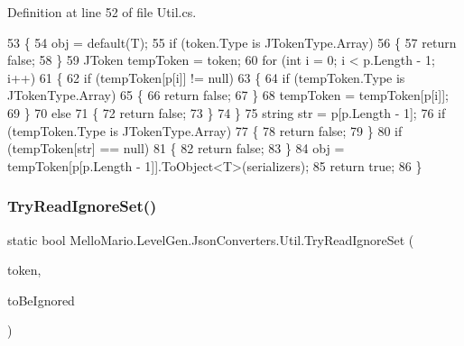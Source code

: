 Definition at line 52 of file Util.\+cs.


\begin{DoxyCode}
53         \{
54             obj = \textcolor{keywordflow}{default}(T);
55             \textcolor{keywordflow}{if} (token.Type is JTokenType.Array)
56             \{
57                 \textcolor{keywordflow}{return} \textcolor{keyword}{false};
58             \}
59             JToken tempToken = token;
60             \textcolor{keywordflow}{for} (\textcolor{keywordtype}{int} i = 0; i < p.Length - 1; i++)
61             \{
62                 \textcolor{keywordflow}{if} (tempToken[p[i]] != null)
63                 \{
64                     \textcolor{keywordflow}{if} (tempToken.Type is JTokenType.Array)
65                     \{
66                         \textcolor{keywordflow}{return} \textcolor{keyword}{false};
67                     \}
68                     tempToken = tempToken[p[i]];
69                 \}
70                 \textcolor{keywordflow}{else}
71                 \{
72                     \textcolor{keywordflow}{return} \textcolor{keyword}{false};
73                 \}
74             \}
75             \textcolor{keywordtype}{string} str = p[p.Length - 1];
76             \textcolor{keywordflow}{if} (tempToken.Type is JTokenType.Array)
77             \{
78                 \textcolor{keywordflow}{return} \textcolor{keyword}{false};
79             \}
80             \textcolor{keywordflow}{if} (tempToken[str] == null)
81             \{
82                 \textcolor{keywordflow}{return} \textcolor{keyword}{false};
83             \}
84             obj = tempToken[p[p.Length - 1]].ToObject<T>(serializers);
85             \textcolor{keywordflow}{return} \textcolor{keyword}{true};
86         \}
\end{DoxyCode}
\mbox{\label{classMelloMario_1_1LevelGen_1_1JsonConverters_1_1Util_a16c66ecc8d088a86c95326ff50dcd373}} 
\subsubsection{Try\+Read\+Ignore\+Set()}
{\footnotesize\ttfamily static bool Mello\+Mario.\+Level\+Gen.\+Json\+Converters.\+Util.\+Try\+Read\+Ignore\+Set (\begin{DoxyParamCaption}\item[{J\+Token}]{token,  }\item[{out I\+Set$<$ Point $>$}]{to\+Be\+Ignored }\end{DoxyParamCaption})\hspace{0.3cm}{\ttfamily [static]}}



